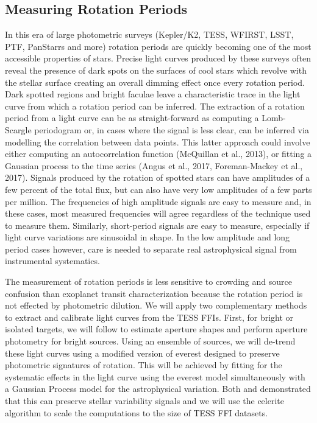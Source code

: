 \documentclass[useAMS, usenatbib, preprint, 12pt]{aastex}
\begin{document}
\subsection{Measuring Rotation Periods}
In this era of large photometric surveys (Kepler/K2, TESS, WFIRST, LSST, PTF,
PanStarrs and more) rotation periods are quickly becoming one of the most
accessible properties of stars.
Precise light curves produced by these surveys often reveal the presence of
dark spots on the surfaces of cool stars which revolve with the stellar
surface creating an overall dimming effect once every rotation period.
Dark spotted regions and bright faculae leave a characteristic trace in the
light curve from which a rotation period can be inferred.
The extraction of a rotation period from a light curve can be as
straight-forward as computing a Lomb-Scargle periodogram or, in cases where
the signal is less clear, can be inferred via modelling the correlation
between data points.
This latter approach could involve either computing an autocorrelation
function (McQuillan et al., 2013), or fitting a Gaussian process to the time
series (Angus et al., 2017, Foreman-Mackey et al., 2017).
Signals produced by the rotation of spotted stars can have amplitudes of a few
percent of the total flux, but can also have very low amplitudes of a few
parts per million.
The frequencies of high amplitude signals are easy to measure and, in these
cases, most measured frequencies will agree regardless of the technique used
to measure them.
Similarly, short-period signals are easy to measure, especially if light curve
variations are sinusoidal in shape.
In the low amplitude and long period cases however, care is needed to separate
real astrophysical signal from instrumental systematics.

The measurement of rotation periods is less sensitive to crowding and source
confusion than exoplanet transit characterization because the rotation period
is not effected by photometric dilution.
We will apply two complementary methods to extract and calibrate light curves
from the TESS FFIs.
First, for bright or isolated targets, we will follow \citet{montet2017} to
estimate aperture shapes and perform aperture photometry for bright sources.
Using an ensemble of sources, we will de-trend these light curves using a
modified version of \textsf{everest} \citep{luger2016, luger2017} designed to
preserve photometric signatures of rotation.
This will be achieved by fitting for the systematic effects in the light curve
using the \textsf{everest} model simultaneously with a Gaussian Process model
for the astrophysical variation.
Both \citet{aigrain2016} and \citet{luger2016} demonstrated that this can
preserve stellar variability signals and we will use the \textsf{celerite}
algorithm \citep{dfm2017} to scale the computations to the size of TESS FFI
datasets.
\end{document}
